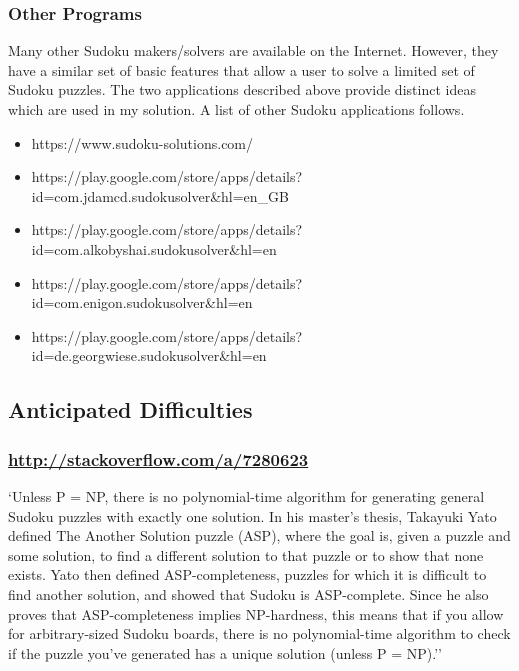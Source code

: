 \documentclass[fleqn]{article}
\begin{document}
\subsubsection{Other Programs}
Many other Sudoku makers/solvers are available on the Internet. However, they have a similar set of basic features that allow a user to solve a limited set of Sudoku puzzles. The two applications described above provide distinct ideas which are used in my solution. A list of other Sudoku applications follows.
\begin{itemize}
\item{https://www.sudoku-solutions.com/}
\item{https://play.google.com/store/apps/details?id=com.jdamcd.sudokusolver\&hl=en\_GB}
\item{https://play.google.com/store/apps/details?id=com.alkobyshai.sudokusolver\&hl=en}
\item{https://play.google.com/store/apps/details?id=com.enigon.sudokusolver\&hl=en}
\item{https://play.google.com/store/apps/details?id=de.georgwiese.sudokusolver\&hl=en}
\end{itemize}


\subsection{Anticipated Difficulties}

\subsubsection*{\url{http://stackoverflow.com/a/7280623}}
‘Unless P = NP, there is no polynomial-time algorithm for generating general Sudoku puzzles with exactly one solution.
In his master's thesis, Takayuki Yato defined The Another Solution puzzle (ASP), where the goal is, given a puzzle and some solution, to find a different solution to that puzzle or to show that none exists. Yato then defined ASP-completeness, puzzles for which it is difficult to find another solution, and showed that Sudoku is ASP-complete. Since he also proves that ASP-completeness implies NP-hardness, this means that if you allow for arbitrary-sized Sudoku boards, there is no polynomial-time algorithm to check if the puzzle you've generated has a unique solution (unless P = NP).’’
\end{document}
